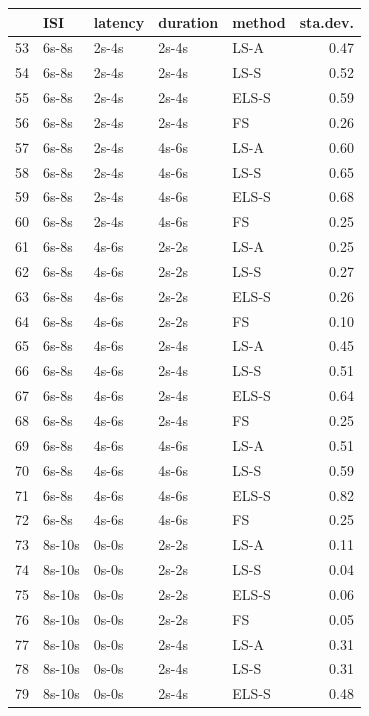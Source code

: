 \begin{table}[ht]
\centering
\begin{tabular}{rllllr}
  \hline
 & ISI & latency & duration & method & sta.dev. \\ 
  \hline
  53 & 6s-8s & 2s-4s & 2s-4s & LS-A & 0.47 \\ 
  54 & 6s-8s & 2s-4s & 2s-4s & LS-S & 0.52 \\ 
  55 & 6s-8s & 2s-4s & 2s-4s & ELS-S & 0.59 \\ 
  56 & 6s-8s & 2s-4s & 2s-4s & FS & 0.26 \\ 
  \hline
  57 & 6s-8s & 2s-4s & 4s-6s & LS-A & 0.60 \\ 
  58 & 6s-8s & 2s-4s & 4s-6s & LS-S & 0.65 \\ 
  59 & 6s-8s & 2s-4s & 4s-6s & ELS-S & 0.68 \\ 
  60 & 6s-8s & 2s-4s & 4s-6s & FS & 0.25 \\ 
  \hline
  61 & 6s-8s & 4s-6s & 2s-2s & LS-A & 0.25 \\ 
  62 & 6s-8s & 4s-6s & 2s-2s & LS-S & 0.27 \\ 
  63 & 6s-8s & 4s-6s & 2s-2s & ELS-S & 0.26 \\ 
  64 & 6s-8s & 4s-6s & 2s-2s & FS & 0.10 \\ 
  \hline
  65 & 6s-8s & 4s-6s & 2s-4s & LS-A & 0.45 \\ 
  66 & 6s-8s & 4s-6s & 2s-4s & LS-S & 0.51 \\ 
  67 & 6s-8s & 4s-6s & 2s-4s & ELS-S & 0.64 \\ 
  68 & 6s-8s & 4s-6s & 2s-4s & FS & 0.25 \\ 
  \hline
  69 & 6s-8s & 4s-6s & 4s-6s & LS-A & 0.51 \\ 
  70 & 6s-8s & 4s-6s & 4s-6s & LS-S & 0.59 \\ 
  71 & 6s-8s & 4s-6s & 4s-6s & ELS-S & 0.82 \\ 
  72 & 6s-8s & 4s-6s & 4s-6s & FS & 0.25 \\ 
  \hline
  73 & 8s-10s & 0s-0s & 2s-2s & LS-A & 0.11 \\ 
  74 & 8s-10s & 0s-0s & 2s-2s & LS-S & 0.04 \\ 
  75 & 8s-10s & 0s-0s & 2s-2s & ELS-S & 0.06 \\ 
  76 & 8s-10s & 0s-0s & 2s-2s & FS & 0.05 \\ 
  \hline
  77 & 8s-10s & 0s-0s & 2s-4s & LS-A & 0.31 \\ 
  78 & 8s-10s & 0s-0s & 2s-4s & LS-S & 0.31 \\ 
  79 & 8s-10s & 0s-0s & 2s-4s & ELS-S & 0.48 \\ 

\end{tabular}
\end{table}
